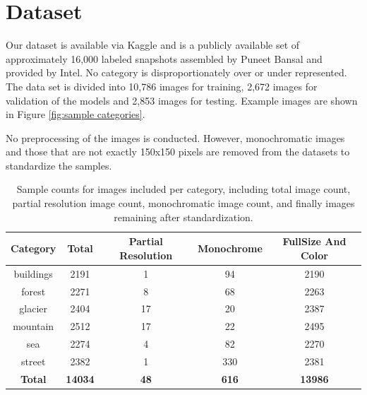 \documentclass[11pt]{article}
\begin{document}
\section{Dataset}
Our dataset is available via Kaggle and is a publicly available set of approximately 16,000 labeled snapshots assembled by Puneet Bansal and provided by Intel\cite{IntelImageDataset}. No category is disproportionately over or under represented. The data set is divided into 10,786 images for training, 2,672 images for validation of the models and 2,853 images for testing. Example images are shown in Figure \ref{fig:sample categories}. 

No pre\-processing of the images is conducted. However, monochromatic images and those that are not exactly 150x150 pixels are removed from the datasets to standardize the samples.

\begin{table}[h]
\centering
\begin{tabular}{|c|c|c|c|c|}
\hline
\textbf{Category} & \textbf{Total} & \textbf{Partial Resolution} & \textbf{Monochrome} & \textbf{FullSize And Color} \\ \hline
buildings         & 2191          & 1                          & 94                  & 2190                        \\ \hline
forest            & 2271          & 8                          & 68                  & 2263                        \\ \hline
glacier           & 2404          & 17                         & 20                  & 2387                        \\ \hline
mountain          & 2512          & 17                         & 22                  & 2495                        \\ \hline
sea               & 2274          & 4                          & 82                  & 2270                        \\ \hline
street            & 2382          & 1                          & 330                 & 2381                        \\ \hline
\textbf{Total}    & \textbf{14034}& \textbf{48}                & \textbf{616}        & \textbf{13986}              \\ \hline
\end{tabular}
\caption{Sample counts for images included per category, including total image count, partial resolution image count, monochromatic image count, and finally images remaining after standardization.}
\label{table EDA}
\end{table}
\end{document}

